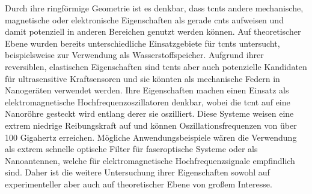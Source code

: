 Durch ihre ringförmige Geometrie ist es denkbar, dass \acp{tcnt} andere mechanische, magnetische oder elektronische Eigenschaften als gerade \acp{cnt} aufweisen und damit potenziell in anderen Bereichen genutzt werden können.\supercite{liu2014curved} Auf theoretischer Ebene wurden bereits unterschiedliche Einsatzgebiete für \acp{tcnt} untersucht, beispielsweise zur Verwendung als Wasserstoffspeicher\supercite{castillo2010hydrogen,cruz2010hydrogen}. Aufgrund ihrer reversiblen, elastischen Eigenschaften sind \acp{tcnt} aber auch potenzielle Kandidaten für ultrasensitive Kraftsensoren und sie könnten als mechanische Federn in Nanogeräten verwendet werden.\supercite{zheng2010elastic,chen2011controlling} Ihre Eigenschaften machen einen Einsatz als elektromagnetische Hochfrequenzoszillatoren denkbar, wobei die \ac{tcnt} auf eine Nanoröhre gesteckt wird entlang derer sie oszilliert. \supercite{hilder2007oscillating,ansari2017oscillation} Diese Systeme weisen eine extrem niedrige Reibungskraft auf\supercite{cumings2000low} und können Oszillationsfrequenzen von über 100 Gigahertz erreichen.\supercite{liu2014curved} Mögliche Anwendungsbeispiele wären die Verwendung als extrem schnelle optische Filter für faseroptische Systeme oder als Nanoantennen, welche für elektromagnetische Hochfrequenzsignale empfindlich sind.\supercite{hilder2007oscillating} Daher ist die weitere Untersuchung ihrer Eigenschaften sowohl auf experimenteller aber auch auf theoretischer Ebene von großem Interesse.

